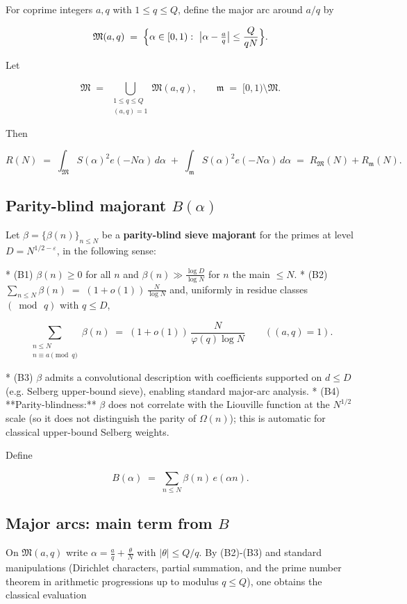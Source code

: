 \documentclass[11pt]{article}
\theoremstyle{definition}
\theoremstyle{remark}
\begin{document}
For coprime integers $a,q$ with $1\le q\le Q$, define the major arc around $a/q$ by

$$
	\mathfrak M(a,q)\;=\;\Bigl\{\alpha\in[0,1):\ \bigl|\alpha-\tfrac{a}{q}\bigr|
	\le \frac{Q}{qN}\Bigr\}.
$$

Let

$$
	\mathfrak M\;=\;\bigcup_{\substack{1\le q\le Q\\ (a,q)=1}}\mathfrak M(a,q),
	\qquad
	\mathfrak m\;=\;[0,1)\setminus\mathfrak M .
$$

Then

$$
	R(N)\;=\;\int_{\mathfrak M} S(\alpha)^2 e(-N\alpha)\,d\alpha\;+\;
	\int_{\mathfrak m} S(\alpha)^2 e(-N\alpha)\,d\alpha
	\;=\;R_{\mathfrak M}(N)+R_{\mathfrak m}(N).
$$


\subsection*{Parity-blind majorant $B(\alpha)$}

Let $\beta=\{\beta(n)\}_{n\le N}$ be a \textbf{parity-blind sieve majorant} for the primes at level $D=N^{1/2-\varepsilon}$, in the following sense:

* (B1) $\beta(n)\ge 0$ for all $n$ and $\beta(n)\gg \tfrac{\log D}{\log N}$ for $n$ the main $\le N$.
* (B2) $\displaystyle \sum_{n\le N}\beta(n)\;=\;(1+o(1))\,\frac{N}{\log N}$ and, uniformly in residue classes $(\bmod\,q)$ with $q\le D$,

$$
	\sum_{\substack{n\le N\\ n\equiv a\!\!\!\pmod q}}\beta(n)
	\;=\;(1+o(1))\,\frac{N}{\varphi(q)\log N}\qquad ((a,q)=1).
$$

* (B3) $\beta$ admits a convolutional description with coefficients supported on $d\le D$ (e.g. Selberg upper-bound sieve), enabling standard major-arc analysis.
* (B4) **Parity-blindness:** $\beta$ does not correlate with the Liouville function at the $N^{1/2}$ scale (so it does not distinguish the parity of $\Omega(n)$); this is automatic for classical upper-bound Selberg weights.

Define

$$
	B(\alpha)\;=\;\sum_{n\le N}\beta(n)\,e(\alpha n).
$$


\subsection*{Major arcs: main term from $B$}

On $\mathfrak M(a,q)$ write $\alpha=\tfrac{a}{q}+\tfrac{\theta}{N}$ with
$|\theta|\le Q/q$. By (B2)-(B3) and standard manipulations (Dirichlet characters, partial summation, and the prime number theorem in arithmetic progressions up to modulus $q\le Q$), one obtains the classical evaluation
\end{document}
